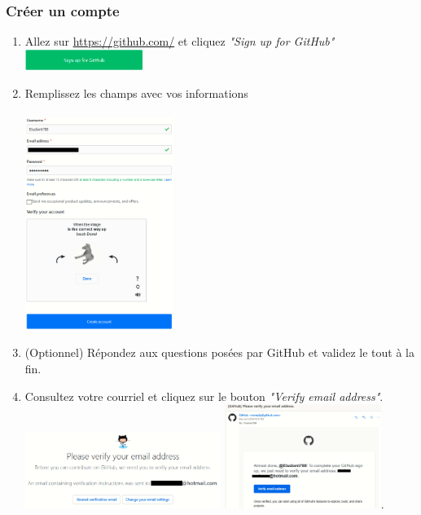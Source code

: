 \documentclass{article}
\begin{document}
\subsubsection{Créer un compte}
\begin{enumerate}
  \item Allez sur \url{https://github.com/} et cliquez \textit{"Sign up for GitHub"} 
  \includegraphics[width=0.3\textwidth, left]{Signup}
  \pagebreak
  \item Remplissez les champs avec vos informations\\\\
  \includegraphics[width=0.38\textwidth, center]{Create_Account}
  
  \item (Optionnel) Répondez aux questions posées par GitHub et validez le tout à la fin.
  
  \item Consultez votre courriel et cliquez sur le bouton \textit{"Verify email address"}.\\
  \includegraphics[width=0.5\textwidth, center]{Verification}
  \includegraphics[width=0.4\textwidth, center]{Verification_Email}.
    

\end{enumerate}
\end{document}
